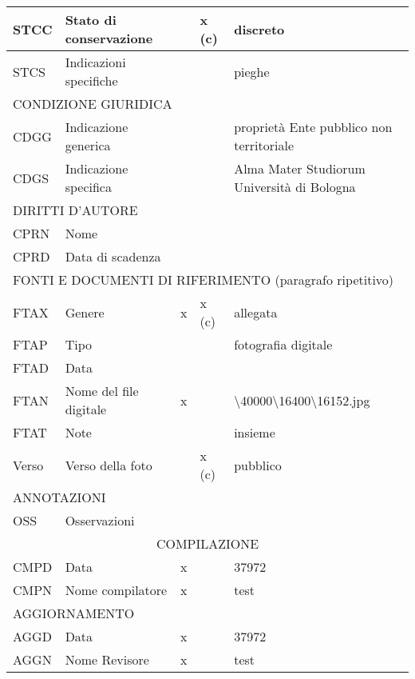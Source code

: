 \begin{center}
\begin{longtable}{ | p{1cm} | p{4cm} | p{.6cm} | p{.6cm} | p{5cm} | }
  STCC & Stato di conservazione &  & x (c) & discreto \\ \hline
  STCS & Indicazioni specifiche &  &  & pieghe \\ \hline
  \multicolumn{5}{|l|}{\cellcolor{lightcyan}CONDIZIONE GIURIDICA} \\ \hline
  CDGG & Indicazione generica &  &  & proprietà Ente pubblico non territoriale \\ \hline
  CDGS & Indicazione specifica &  &  & Alma Mater Studiorum Università di Bologna \\ \hline
  \multicolumn{5}{|l|}{\cellcolor{lightcyan}DIRITTI D’AUTORE} \\ \hline
  CPRN & Nome &  &  &  \\ \hline
  CPRD & Data di scadenza &  &  &  \\ \hline
  \multicolumn{5}{|l|}{\cellcolor{lightcyan}FONTI E DOCUMENTI DI RIFERIMENTO (paragrafo ripetitivo)} \\ \hline
  FTAX & Genere & x & x (c) & allegata \\ \hline
  FTAP & Tipo &  &  & fotografia digitale \\ \hline
  FTAD & Data &  &  &  \\ \hline
  FTAN & Nome del file digitale & x &  & \textbackslash40000\textbackslash16400\textbackslash16152.jpg \\ \hline
  FTAT & Note &  &  & insieme \\ \hline
  Verso & Verso della foto &  & x (c) & pubblico \\ \hline
  \multicolumn{5}{|l|}{\cellcolor{lightcyan}ANNOTAZIONI} \\ \hline
  OSS & Osservazioni &  &  &  \\ \hline
  \multicolumn{5}{|c|}{\cellcolor{lightcyan}COMPILAZIONE} \\ \hline
  CMPD & Data & x &  & 37972 \\ \hline
  CMPN & Nome compilatore & x &  & test \\ \hline
  \multicolumn{5}{|l|}{\cellcolor{lightcyan}AGGIORNAMENTO} \\ \hline
  AGGD & Data & x &  & 37972 \\ \hline
  AGGN & Nome Revisore & x &  & test \\ \hline
\end{longtable}

\newpage

 


\end{center}
